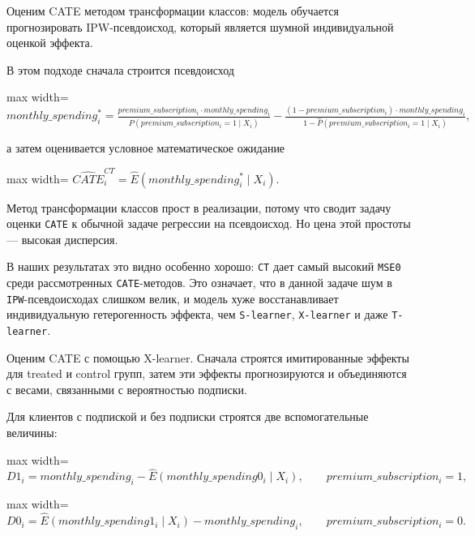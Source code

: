 \documentclass[11pt]{article}
\begin{document}
    Оценим CATE методом трансформации классов: модель обучается
прогнозировать IPW-псевдоисход, который является шумной индивидуальной
оценкой эффекта.

В этом подходе сначала строится псевдоисход

\begin{center}
\begin{adjustbox}{max width=\linewidth}
\(\displaystyle monthly\_spending_i^{*} = \frac{premium\_subscription_i \cdot monthly\_spending_i}{\hat{P}(premium\_subscription_i = 1 \mid X_i)} - \frac{(1-premium\_subscription_i) \cdot monthly\_spending_i}{1 - \hat{P}(premium\_subscription_i = 1 \mid X_i)},\)
\end{adjustbox}
\end{center}

а затем оценивается условное математическое ожидание

\begin{center}
\begin{adjustbox}{max width=\linewidth}
\(\displaystyle \widehat{CATE}^{CT}_i = \widehat{E}(monthly\_spending_i^{*} \mid X_i).\)
\end{adjustbox}
\end{center}

    Метод трансформации классов прост в реализации, потому что сводит задачу
оценки \texttt{CATE} к обычной задаче регрессии на псевдоисход. Но цена
этой простоты --- высокая дисперсия.

В наших результатах это видно особенно хорошо: \texttt{CT} дает самый
высокий \texttt{MSE0} среди рассмотренных \texttt{CATE}-методов. Это
означает, что в данной задаче шум в \texttt{IPW}-псевдоисходах слишком
велик, и модель хуже восстанавливает индивидуальную гетерогенность
эффекта, чем \texttt{S-learner}, \texttt{X-learner} и даже
\texttt{T-learner}.

    Оценим CATE с помощью X-learner. Сначала строятся имитированные эффекты
для treated и control групп, затем эти эффекты прогнозируются и
объединяются с весами, связанными с вероятностью подписки.

Для клиентов с подпиской и без подписки строятся две вспомогательные
величины:

\begin{center}
\begin{adjustbox}{max width=\linewidth}
\(\displaystyle D1_i = monthly\_spending_i - \widehat{E}(monthly\_spending0_i \mid X_i), \qquad premium\_subscription_i = 1,\)
\end{adjustbox}
\end{center}
\begin{center}
\begin{adjustbox}{max width=\linewidth}
\(\displaystyle D0_i = \widehat{E}(monthly\_spending1_i \mid X_i) - monthly\_spending_i, \qquad premium\_subscription_i = 0.\)
\end{adjustbox}
\end{center}
\end{document}
